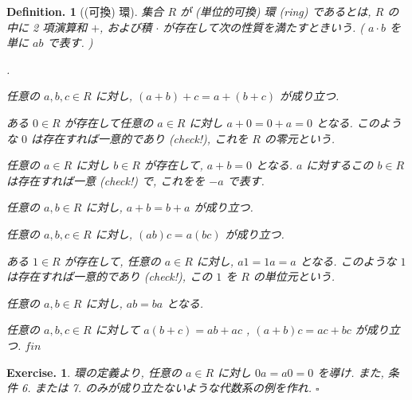 \documentclass[openany, a4paper, oneside]{jsbook}
\newcounter{enum2}
\renewenvironment{enumerate}{%
\begin{list}%
{%
\arabic{enum2}.\ \,%
}%
{%
\usecounter{enum2}
\setlength{\itemindent}{0pt}%
\setlength{\leftmargin}{15pt}%
\setlength{\rightmargin}{0pt}%
\setlength{\labelsep}{0pt}%
\setlength{\labelwidth}{6pt}%
\setlength{\itemsep}{0pt}%
\setlength{\parsep}{0pt}%
\setlength{\listparindent}{0pt}%
}
}{%
\end{list}%
}
\theoremstyle{break}
\theoremstyle{breakdefn}
\newtheorem{defn}[thm]{Definition.}
\newtheorem{exercise}[thm]{Exercise.}
\newcommand{\fin}{\hfill $\square$ \par}
\begin{document}
\begin{defn}[(可換) 環]
集合 $R$ が (単位的可換) 環 (ring) であるとは,
$R$ の中に 2 項演算和 $+$, および積 $\cdot$ が存在して次の性質を満たすときいう.
( $a \cdot b$ を単に $ab$ で表す. )
\begin{enumerate}
\item 任意の $a,b,c \in R$ に対し,  $(a + b) + c = a + (b + c)$ が成り立つ.
\item ある $0 \in R$ が存在して任意の $a \in R$ に対し $a+0=0+a=0$ となる.
   このような $0$ は存在すれば一意的であり (check!), これを $R$ の零元という.
\item 任意の $a \in R$ に対し $b \in R$ が存在して, $a+b=0$ となる.
   $a$ に対するこの $b \in R$ は存在すれば一意 (check!) で, これをを $-a$ で表す.
\item 任意の $a,b \in R$ に対し,  $a+b=b+a$ が成り立つ.
\item 任意の $a,b,c \in R$ に対し,  $(ab) c=a (bc)$ が成り立つ.
\item ある $1 \in R$ が存在して, 任意の $a \in R$ に対し,  $a1=1a=a$ となる.
   このような $1$ は存在すれば一意的であり (check!), この $1$ を $R$ の単位元という.
\item 任意の $a,b \in R$ に対し,  $ab=ba$ となる.
\item 任意の $a,b,c \in R$ に対して $a (b+c)=ab+ac$ ,  $(a+b) c=ac+bc$ が成り立つ. $fin$
\end{enumerate}
\end{defn}
\begin{exercise}
環の定義より, 任意の $a \in R$ に対し $0a=a0=0$ を導け.
また, 条件 6. または 7. のみが成り立たないような代数系の例を作れ. \fin
\end{exercise}
\end{document}
